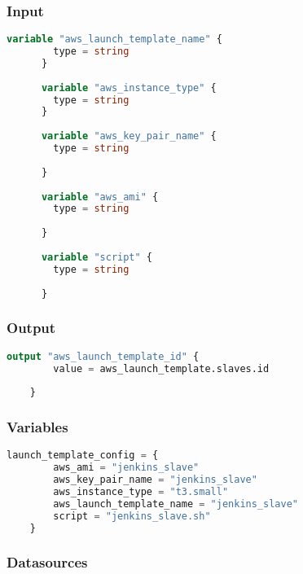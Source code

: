 \subsubsection{
{Input}}

\begin{lstlisting}[language=terraform]
    variable "aws_launch_template_name" {
        type = string
      }
      
      variable "aws_instance_type" {
        type = string
      }
      
      variable "aws_key_pair_name" {
        type = string
        
      }
      
      variable "aws_ami" {
        type = string
        
      }
      
      variable "script" {
        type = string
        
      }
\end{lstlisting}

\subsubsection{
{Output}}

\begin{lstlisting}[language=terraform]
    output "aws_launch_template_id" {
        value = aws_launch_template.slaves.id
      
    } 
\end{lstlisting}

\subsubsection{
{Variables}}

\begin{lstlisting}[language=terraform]
    launch_template_config = {
        aws_ami = "jenkins_slave"
        aws_key_pair_name = "jenkins_slave"
        aws_instance_type = "t3.small"
        aws_launch_template_name = "jenkins_slave"
        script = "jenkins_slave.sh"
    }
\end{lstlisting}

\subsubsection{
{Datasources}}

